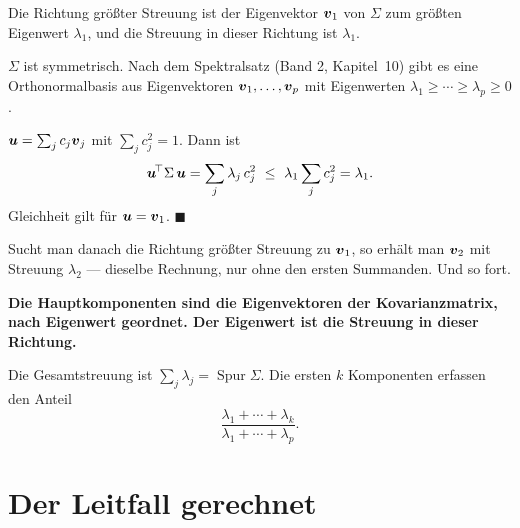 \begin{merksatz}
Die Richtung größter Streuung ist der Eigenvektor $\boldsymbol{v}_1$ von $\Sigma$ zum größten Eigenwert $\lambda_1$, und die Streuung in dieser Richtung ist $\lambda_1$.

$\Sigma$ ist symmetrisch. Nach dem Spektralsatz (Band 2, Kapitel~10) gibt es eine Orthonormalbasis aus Eigenvektoren $\boldsymbol{v}_1,\ldots,\boldsymbol{v}_p$ mit Eigenwerten $\lambda_1 \ge \cdots \ge \lambda_p \ge 0$.

 $\boldsymbol{u} = \sum_j c_j\boldsymbol{v}_j$ mit $\sum_j c_j^{2} = 1$. Dann ist
\[ \boldsymbol{u}^{\!\top}\Sigma\,\boldsymbol{u} = \sum_j \lambda_j\,c_j^{2} \ \le\ \lambda_1\sum_j c_j^{2} = \lambda_1 . \]
Gleichheit gilt für $\boldsymbol{u} = \boldsymbol{v}_1$. $\blacksquare$

Sucht man danach die Richtung größter Streuung  zu $\boldsymbol{v}_1$, so erhält man $\boldsymbol{v}_2$ mit Streuung $\lambda_2$ --- dieselbe Rechnung, nur ohne den ersten Summanden. Und so fort.

\begin{center}
\begin{minipage}{0.9\textwidth}
\textbf{Die Hauptkomponenten sind die Eigenvektoren der Kovarianzmatrix, nach Eigenwert geordnet. Der Eigenwert ist die Streuung in dieser Richtung.}
\end{minipage}
\end{center}

Die Gesamtstreuung ist $\sum_j\lambda_j = \operatorname{Spur}\Sigma$. Die ersten $k$ Komponenten erfassen den Anteil
\[ \frac{\lambda_1 + \cdots + \lambda_k}{\lambda_1 + \cdots + \lambda_p} . \]
\end{merksatz}

\section{Der Leitfall gerechnet}

